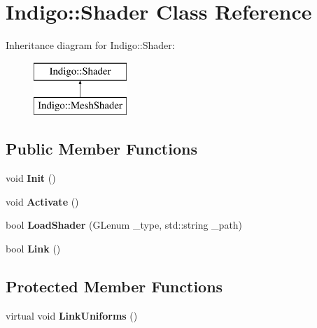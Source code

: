 \hypertarget{class_indigo_1_1_shader}{}\section{Indigo\+:\+:Shader Class Reference}
\label{class_indigo_1_1_shader}
Inheritance diagram for Indigo\+:\+:Shader\+:\begin{figure}[H]
\begin{center}
\leavevmode
\includegraphics[height=2.000000cm]{class_indigo_1_1_shader}
\end{center}
\end{figure}
\subsection*{Public Member Functions}
\begin{DoxyCompactItemize}
\item 
\mbox{\label{class_indigo_1_1_shader_a9143ecbc145cc7d16f0ccd352e576540}} 
void {\bfseries Init} ()
\item 
\mbox{\label{class_indigo_1_1_shader_a4315a6336472b293392aa50e7a4e65d0}} 
void {\bfseries Activate} ()
\item 
\mbox{\label{class_indigo_1_1_shader_a49b6c5b41ca89e0888b5e72903a5a02e}} 
bool {\bfseries Load\+Shader} (G\+Lenum \+\_\+type, std\+::string \+\_\+path)
\item 
\mbox{\label{class_indigo_1_1_shader_a4d19cc34a5294ae473d624bd86630cbf}} 
bool {\bfseries Link} ()
\end{DoxyCompactItemize}
\subsection*{Protected Member Functions}
\begin{DoxyCompactItemize}
\item 
\mbox{\label{class_indigo_1_1_shader_a5a6d1dc79e2ba714942d2e8ce055d718}} 
virtual void {\bfseries Link\+Uniforms} ()
\end{DoxyCompactItemize}
